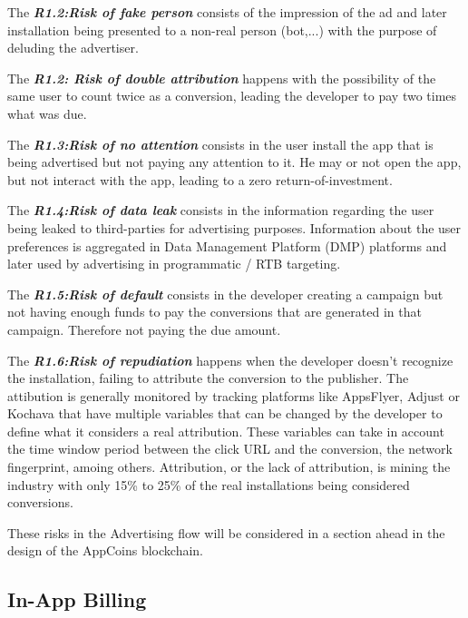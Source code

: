 \begin{tcolorbox}[enhanced jigsaw,sharp corners, drop fuzzy shadow=ShadowColor]

The {\bf\em R1.2:Risk of fake person} consists of the impression of the ad and later installation being presented to a non-real person (bot,...) with the purpose of deluding the advertiser. 


The {\bf\em R1.2: Risk of double attribution} happens with the possibility of the same user to count twice as a conversion, leading the developer to pay two times what was due.


The {\bf\em R1.3:Risk of no attention}  consists in the user install the app that is being advertised but not paying any attention to it. He may or not open the app, but not interact with the app, leading to a zero return-of-investment.


The {\bf\em R1.4:Risk of data leak} consists in the information regarding the user being leaked to third-parties for advertising purposes. Information about the user preferences is aggregated in Data Management Platform (DMP) platforms and later used by advertising in programmatic / RTB targeting. 

The {\bf\em R1.5:Risk of default} consists in the developer creating a campaign but not having enough funds to pay the conversions that are generated in that campaign. Therefore not paying the due amount.


The {\bf\em R1.6:Risk of repudiation} happens when the developer doesn't recognize the installation, failing to attribute the conversion to the publisher. The attibution is generally monitored by tracking platforms like AppsFlyer, Adjust or Kochava that have multiple variables that can be changed by the developer to define what it considers a real attribution. These variables can take in account the time window period between the click URL and the conversion, the network fingerprint, amoing others. Attribution, or the lack of attribution, is mining the industry with only 15\% to 25\% of the real installations being considered conversions.


\end{tcolorbox}

These risks in the Advertising flow will be considered in a section ahead in the design of the AppCoins blockchain.


\subsection{In-App Billing}

